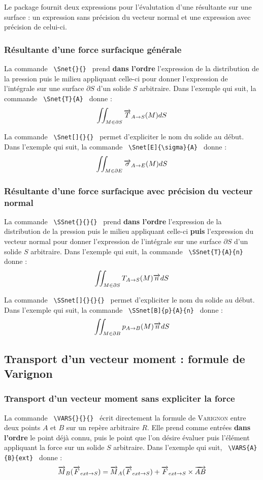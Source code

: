 \documentclass[12pt]{article}
\begin{document}
Le package fournit deux expressions pour l'évalutation d'une résultante sur une surface : un expression sans précision du vecteur normal et une expression avec précision de celui-ci.

\subsubsection{Résultante d'une force surfacique générale}

La commande \verb| \Snet{}{} | prend \textbf{dans l'ordre} l'expression de la distribution de la pression puis le milieu appliquant celle-ci pour donner l'expression de l'intégrale sur une surface $\partial S$ d'un solide $S$ arbitraire. Dans l'exemple qui suit, la commande \verb| \Snet{T}{A} | donne : $$\Snet{T}{A}$$

La commande \verb| \Snet[]{}{} | permet d'expliciter le nom du solide au début. Dans l'exemple qui suit, la commande \verb| \Snet[E]{\sigma}{A} | donne : $$\Snet[E]{\sigma}{A}$$

\subsubsection{Résultante d'une force surfacique avec précision du vecteur normal}

La commande \verb| \SSnet{}{}{} | prend \textbf{dans l'ordre} l'expression de la distribution de la pression puis le milieu appliquant celle-ci \textbf{puis} l'expression du vecteur normal pour donner l'expression de l'intégrale sur une surface $\partial S$ d'un solide $S$ arbitraire. Dans l'exemple qui suit, la commande \verb| \SSnet{T}{A}{n} | donne : $$\SSnet{T}{A}{n}$$

La commande \verb| \SSnet[]{}{}{} | permet d'expliciter le nom du solide au début. Dans l'exemple qui suit, la commande \verb| \SSnet[B]{p}{A}{n} | donne : $$\SSnet[B]{p}{A}{n}$$

\subsection{Transport d'un vecteur moment : formule de Varignon}

\subsubsection{Transport d'un vecteur moment sans expliciter la force}

La commande \verb| \VARS{}{}{} | écrit directement la formule de \textsc{Varignon} entre deux points $A$ et $B$ sur un repère arbitraire $R$. Elle prend comme entrées \textbf{dans l'ordre} le point déjà connu, puis le point que l'on désire évaluer puis l'élément appliquant la force sur un solide $S$ arbitraire. Dans l'exemple qui suit, \verb| \VARS{A}{B}{ext} | donne : $$\VARS{A}{B}{ext}$$
\end{document}
